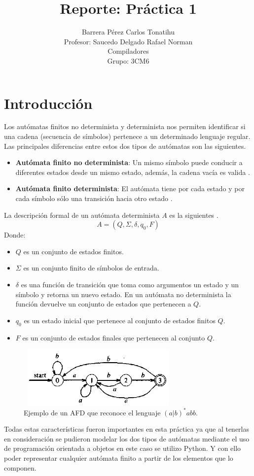 \documentclass[titlepage]{article}
\title{Reporte: Práctica 1}
\author{Barrera Pérez Carlos Tonatihu \\ Profesor: Saucedo Delgado Rafael Norman \\ Compiladores \\ Grupo: 3CM6 }
\begin{document}
	\maketitle
	\tableofcontents
	\newpage
	\section{Introducción}
	Los autómatas finitos no determinista y determinista nos permiten identificar si una cadena (secuencia de símbolos) 
	pertenece a un determinado lenguaje regular. Las principales diferencias entre estos dos tipos de autómatas son las siguientes.
	
	\begin{itemize}
		\item \textbf{Autómata finito no determinista}: Un mismo símbolo puede conducir a diferentes estados desde un mismo estado, 
		además, la cadena vacía es valida \cite{compis}.
		\item \textbf{Autómata finito determinista}: El autómata tiene por cada estado y por cada símbolo sólo una transición hacia otro estado \cite{compis}.
	\end{itemize}

	La descripción formal de un autómata determinista $A$ es la siguientes \cite{automata}.
	\[ A = (Q, \Sigma , \delta, q_{0}, F) \]
	Donde:
	
	\begin{itemize}
		\item $Q$ es un conjunto de estados finitos.
		\item $\Sigma$ es un conjunto finito de símbolos de entrada.
		\item $\delta$ es una función de transición que toma como argumentos un estado y un símbolo y retorna un nuevo estado. 
		En un autómata no determinista la función devuelve un conjunto de estados que pertenecen a $Q$.
		\item $q_{0}$ es un estado inicial que pertenece al conjunto de estados finitos $Q$.
		\item $F$ es un conjunto de estados finales que pertenecen al conjunto $Q$.

	\end{itemize}

	\begin{figure}[H]
		\begin{center}
			\includegraphics[width=8cm, height=3cm]{AFD.png}
			\caption{Ejemplo de un AFD que reconoce el lenguaje $(a|b)^{*}abb$.}
			\label{fig:AFD}
		\end{center}
	\end{figure}
	Todas estas características fueron importantes en esta práctica ya que al tenerlas en consideración se pudieron 
	modelar los dos tipos de autómatas mediante el uso de programación orientada a objetos en este caso se utilizo Python. 
	Y con ello poder representar cualquier autómata finito a partir de los elementos que lo componen.
	\newpage
\end{document}
